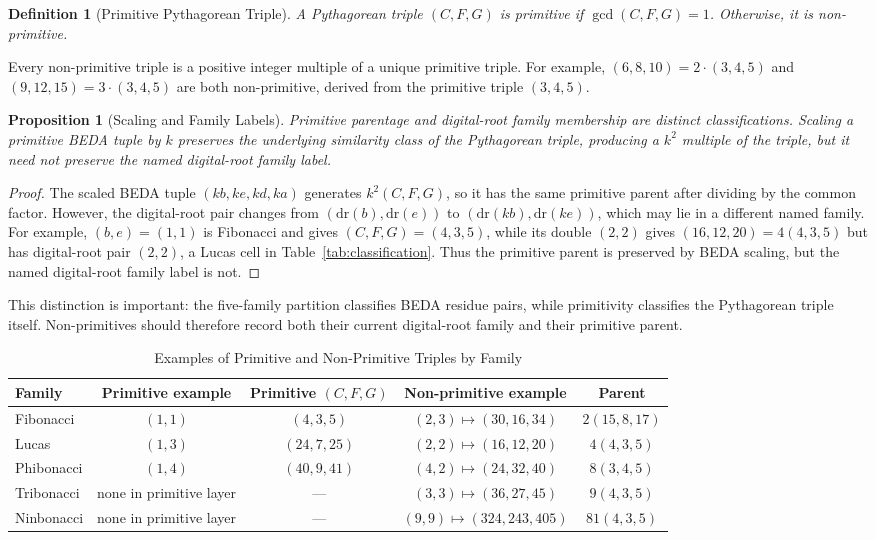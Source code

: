 \documentclass[12pt]{article}
\newtheorem{proposition}[theorem]{Proposition}
\newtheorem{definition}{Definition}
\begin{document}
\begin{definition}[Primitive Pythagorean Triple]
A Pythagorean triple $(C, F, G)$ is \emph{primitive} if $\gcd(C, F, G) = 1$. Otherwise, it is \emph{non-primitive}.
\end{definition}

Every non-primitive triple is a positive integer multiple of a unique primitive triple. For example, $(6, 8, 10) = 2 \cdot (3, 4, 5)$ and $(9, 12, 15) = 3 \cdot (3, 4, 5)$ are both non-primitive, derived from the primitive triple $(3, 4, 5)$.

\begin{proposition}[Scaling and Family Labels]
Primitive parentage and digital-root family membership are distinct classifications. Scaling a primitive BEDA tuple by $k$ preserves the underlying similarity class of the Pythagorean triple, producing a $k^2$ multiple of the triple, but it need not preserve the named digital-root family label.
\end{proposition}

\begin{proof}
The scaled BEDA tuple $(kb,ke,kd,ka)$ generates $k^2(C,F,G)$, so it has the same primitive parent after dividing by the common factor. However, the digital-root pair changes from $(\mathrm{dr}(b),\mathrm{dr}(e))$ to $(\mathrm{dr}(kb),\mathrm{dr}(ke))$, which may lie in a different named family. For example, $(b,e)=(1,1)$ is Fibonacci and gives $(C,F,G)=(4,3,5)$, while its double $(2,2)$ gives $(16,12,20)=4(4,3,5)$ but has digital-root pair $(2,2)$, a Lucas cell in Table~\ref{tab:classification}. Thus the primitive parent is preserved by BEDA scaling, but the named digital-root family label is not.
\end{proof}

This distinction is important: the five-family partition classifies BEDA residue pairs, while primitivity classifies the Pythagorean triple itself. Non-primitives should therefore record both their current digital-root family and their primitive parent.

\begin{table}[h!]
\centering
\caption{Examples of Primitive and Non-Primitive Triples by Family}
\label{tab:primitive_examples}
\small
\begin{tabular}{lcccc}
\toprule
\textbf{Family} & \textbf{Primitive example} & \textbf{Primitive $(C,F,G)$} & \textbf{Non-primitive example} & \textbf{Parent} \\
\midrule
Fibonacci & $(1,1)$ & $(4,3,5)$ & $(2,3)\mapsto(30,16,34)$ & $2(15,8,17)$ \\
Lucas & $(1,3)$ & $(24,7,25)$ & $(2,2)\mapsto(16,12,20)$ & $4(4,3,5)$ \\
Phibonacci & $(1,4)$ & $(40,9,41)$ & $(4,2)\mapsto(24,32,40)$ & $8(3,4,5)$ \\
Tribonacci & none in primitive layer & --- & $(3,3)\mapsto(36,27,45)$ & $9(4,3,5)$ \\
Ninbonacci & none in primitive layer & --- & $(9,9)\mapsto(324,243,405)$ & $81(4,3,5)$ \\
\bottomrule
\end{tabular}
\end{table}
\end{document}
